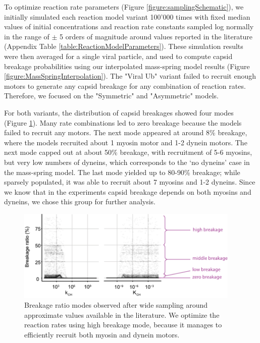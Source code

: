 To optimize reaction rate parameters (Figure \ref{figure:samplingSchematic}), we initially simulated each reaction model variant 100’000 times with fixed median values of initial concentrations and reaction rate constants sampled log normally in the range of $\pm$ 5 orders of magnitude around values reported in the literature (Appendix Table \ref{table:ReactionModelParameters}). These simulation results were then averaged for a single viral particle, and used to compute capsid breakage probabilities using our interpolated mass-spring model results (Figure \ref{figure:MassSpringInterpolation}). The "Viral Ub" variant failed to recruit enough motors to generate any capsid breakage for any combination of reaction rates. Therefore, we focused on the "Symmetric" and "Asymmetric" models.

For both variants, the distribution of capsid breakages showed four modes (Figure \ref{figure:BreakageModesRatesSelection}). Many rate combinations led to zero breakage because the models failed to recruit any motors. The next mode appeared at around 8\% breakage, where the models recruited about 1 myosin motor and 1-2 dynein motors. The next mode capped out at about 50\% breakage, with recruitment of 5-6 myosins, but very low numbers of dyneins, which corresponds to the ‘no dyneins’ case in the mass-spring model. The last mode yielded up to 80-90\% breakage; while sparsely populated, it was able to recruit about 7 myosins and 1-2 dyneins. Since we know that in the experiments capsid breakage depends on both myosins and dyneins, we chose this group for further analysis.

\begin{figure}
\begin{center}
\includegraphics[width=0.95\textwidth, trim={0cm 0cm 0cm 0cm}, clip]{D_chapters/2_ReactionModel/ratesSelection.pdf}
\caption[Breakage ratio modes]%
{Breakage ratio modes observed after  wide sampling around approximate values available in the literature. We optimize the reaction rates using high breakage mode, because it manages to efficiently recruit both myosin and dynein motors.}
\label{figure:BreakageModesRatesSelection}
\end{center}
\end{figure}

